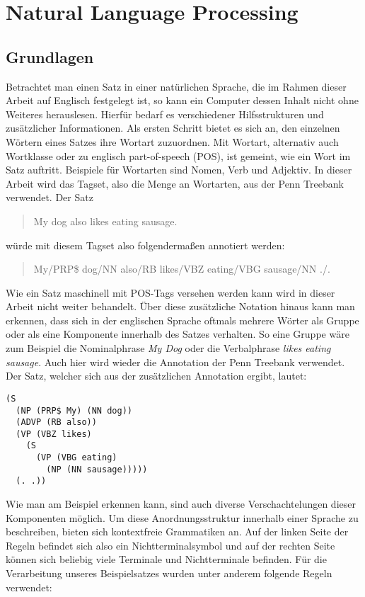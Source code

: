 %
\chapter{Natural Language Processing}
\label{sec:nlp}

\section{Grundlagen}
\label{sec:nlp:grundlagen}

Betrachtet man einen Satz in einer natürlichen Sprache, die im Rahmen dieser Arbeit auf Englisch festgelegt ist, so kann ein Computer dessen Inhalt nicht ohne Weiteres herauslesen. Hierfür bedarf es verschiedener Hilfsstrukturen und zusätzlicher Informationen. Als ersten Schritt bietet es sich an, den einzelnen Wörtern eines Satzes ihre Wortart zuzuordnen. Mit Wortart, alternativ auch Wortklasse oder zu englisch part-of-speech (POS), ist gemeint, wie ein Wort im Satz auftritt. Beispiele für Wortarten sind Nomen, Verb und Adjektiv. In dieser Arbeit wird das Tagset, also die Menge an Wortarten, aus der Penn Treebank verwendet. %
Der Satz
\begin{quote}
My dog also likes eating sausage.
\end{quote}
würde mit diesem Tagset also folgendermaßen annotiert werden:
\begin{quote}
My/PRP\$ dog/NN also/RB likes/VBZ eating/VBG sausage/NN ./.
\end{quote}
Wie ein Satz maschinell mit POS-Tags versehen werden kann wird in dieser Arbeit nicht weiter behandelt. 
Über diese zusätzliche Notation hinaus kann man erkennen, dass sich in der englischen Sprache oftmals mehrere Wörter als Gruppe oder als eine Komponente innerhalb des Satzes verhalten. So eine Gruppe wäre zum Beispiel die Nominalphrase \textit{My Dog} oder die Verbalphrase \textit{likes eating sausage}. Auch hier wird wieder die Annotation der Penn Treebank verwendet. %
Der Satz, welcher sich aus der zusätzlichen Annotation ergibt, lautet:
\begin{lstlisting}
(S
  (NP (PRP$ My) (NN dog))
  (ADVP (RB also))
  (VP (VBZ likes)
    (S
      (VP (VBG eating)
        (NP (NN sausage)))))
  (. .))
\end{lstlisting}
Wie man am Beispiel erkennen kann, sind auch diverse Verschachtelungen dieser Komponenten möglich. Um diese Anordnungsstruktur innerhalb einer Sprache zu beschreiben, bieten sich kontextfreie Grammatiken an. Auf der linken Seite der Regeln befindet sich also ein Nichtterminalsymbol und auf der rechten Seite können sich beliebig viele Terminale und Nichtterminale befinden. Für die Verarbeitung unseres Beispielsatzes wurden unter anderem folgende Regeln verwendet: %
